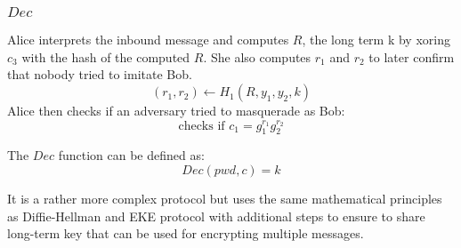 \documentclass[../main.tex]{subfiles}
\begin{document}
\subsubsection{\(Dec\)} Alice interprets the inbound message  and computes
\(R\), the long term k by xoring \(c_3\) with the hash of the computed \(R\).
She also computes \(r_1\) and \(r_2\) to later confirm that nobody tried to
imitate Bob.
\[(r_1, r_2) \gets H_1(R, y_1, y_2, k)\]
Alice then checks if an adversary tried to masquerade as Bob:
\[\text{checks if } c_1 = g_1^{r_1} g_2^{r_2}\]

The \(Dec\) function can be defined as:
\[Dec(pwd, c) = k\]

It is a rather more complex protocol but uses the same mathematical principles as
Diffie-Hellman and EKE protocol with additional steps to ensure to share
long-term key that can be used for encrypting multiple messages.
\end{document}
